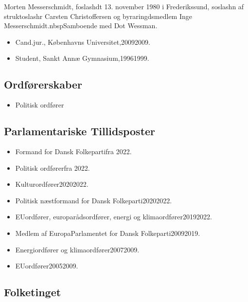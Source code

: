 \documentclass[11pt, a4paper]{awesome-cv}
\begin{document}
\makecvheader[R]
\makelettertitle
\begin{cvletter}
Morten Messerschmidt, foslashdt 13. november 1980 i Frederikssund, soslashn af struktoslashr Carsten Christoffersen og byraringdsmedlem Inge Messerschmidt.nbspSamboende med Dot Wessman.

\begin{itemize}
\item Cand.jur., Københavns Universitet,20092009.
\item Student, Sankt Annæ Gymnasium,19961999.
\end{itemize}
\subsection*{Ordførerskaber}
\begin{itemize}
\item Politisk ordfører
\end{itemize}
\subsection*{Parlamentariske Tillidsposter}
\begin{itemize}
\item Formand for Dansk Folkepartifra 2022.
\item Politisk ordførerfra 2022.
\item Kulturordfører20202022.
\item Politisk næstformand for Dansk Folkeparti20202022.
\item EUordfører, europarådsordfører, energi og klimaordfører20192022.
\item Medlem af EuropaParlamentet for Dansk Folkeparti20092019.
\item Energiordfører og klimaordfører20072009.
\item EUordfører20052009.
\end{itemize}
\subsection*{Folketinget}

\end{cvletter}
\end{document}

